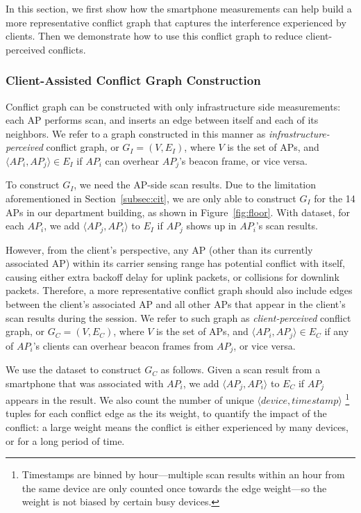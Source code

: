 In this section, we first show how the smartphone measurements can help build a
more representative conflict graph that captures the interference experienced by
clients. Then we demonstrate how to use this conflict graph to reduce
client-perceived conflicts.

\subsubsection{Client-Assisted Conflict Graph Construction}
\label{subsec:client_conflict}

Conflict graph can be constructed with only infrastructure side measurements:
each AP performs \wifi{} scan, and inserts an edge between itself and
each of its neighbors. We refer to a graph constructed in this manner as
\textit{infrastructure-perceived} conflict graph, or $G_I=(V, E_I)$, where $V$
is the set of APs, and $\langle AP_i, AP_j \rangle \in E_I$ if $AP_i$ can
overhear $AP_j$'s beacon frame, or vice versa. 

To construct $G_I$, we need the AP-side scan results. Due to the limitation
aforementioned in Section~\ref{subsec:cit}, we are only able to construct $G_I$
for the 14 APs in our department building, as shown in Figure~\ref{fig:floor}.
With \ubapdetail{} dataset, for each $AP_i$, we add $\langle AP_j, AP_i \rangle$
to $E_I$ if $AP_j$ shows up in $AP_i$'s scan results.



However, from the \wifi{} client's perspective, any AP (other than its currently
associated AP) within its carrier sensing range has potential conflict with
itself, causing either extra backoff delay for uplink packets, or collisions for
downlink packets. Therefore, a more representative conflict graph should also
include edges between the client's associated AP and all other APs that appear
in the client's scan results during the \wifi{} session. We refer to such graph as
\textit{client-perceived} conflict graph, or $G_C=(V, E_C)$, where $V$ is the
set of APs, and $\langle AP_i, AP_j \rangle \in E_C$ if any of $AP_i$'s clients
can overhear beacon frames from $AP_j$, or vice versa.

We use the \ubscan{} dataset to construct $G_C$ as follows. Given a scan
result from a smartphone that was associated with $AP_i$, we add $\langle AP_j,
AP_i \rangle$ to $E_C$ if $AP_j$ appears in the result. We also count the number
of unique $\langle device, timestamp \rangle$%
\footnote{Timestamps are binned by hour---multiple scan results within an hour
from the same device are only counted once towards the edge weight---so the
weight is not  biased by certain busy devices.} %
tuples for each conflict edge as the its weight, to quantify the impact of
the conflict: a large weight means the conflict is either experienced by many
devices, or for a long period of time.



